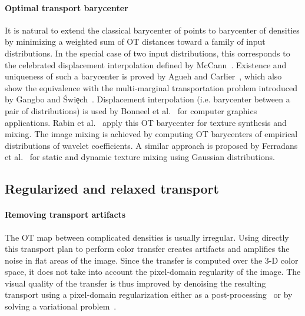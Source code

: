 \paragraph{Optimal transport barycenter}

It is natural to extend the classical barycenter of points to barycenter of densities by minimizing a weighted sum of OT distances toward a family of input distributions. In the special case of two input distributions, this corresponds to the celebrated displacement interpolation defined by McCann~\cite{mccann1997convexity}. Existence and uniqueness of such a barycenter is proved by Agueh and Carlier~\cite{Carlier_wasserstein_barycenter}, which also show the equivalence with the multi-marginal transportation problem introduced by Gangbo and {\'S}wi\c{e}ch~\cite{gangbo1998optimal}.  Displacement interpolation (i.e. barycenter between a pair of distributions) is used by Bonneel et al.~\cite{Bonneel-displacement} for computer graphics applications.  Rabin et al.~\cite{Rabin_ssvm11} apply this OT barycenter for texture synthesis and mixing. The image mixing is achieved by computing OT barycenters of empirical distributions of wavelet coefficients.  A similar approach is proposed by Ferradans et al.~\cite{2013-ssvm-mixing} for static and dynamic texture mixing using Gaussian distributions. \\




\subsection{Regularized and relaxed transport}
\label{subsec-regul-intro}




\paragraph{Removing transport artifacts}

The OT map between complicated densities is usually irregular. Using directly this transport plan to perform color transfer creates artifacts and amplifies the noise in flat areas of the image. Since the transfer is computed over the 3-D color space, it does not take into account the pixel-domain regularity of the image. The visual quality of the transfer is thus improved by denoising the resulting transport using a pixel-domain regularization either as a post-processing~\cite{Papadakis_ip11} or by solving a variational problem~\cite{Papadakis_ip11,Rabin_icip11}.


